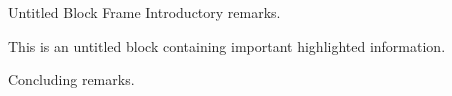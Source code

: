 \documentclass[14pt,t]{beamer-accessibility}
\begin{document}
\begin{frame}{Untitled Block Frame}
Introductory remarks.

\begin{block}{}
This is an untitled block containing important highlighted information.
\end{block}

Concluding remarks.
\end{frame}
\end{document}
